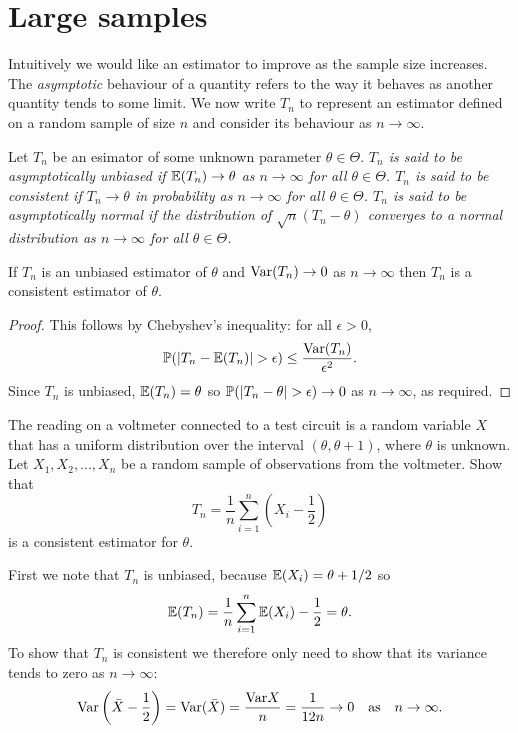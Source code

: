 
\section{Large samples}\label{sec:large_samples}

Intuitively we would like an estimator to improve as the sample size increases. The \emph{asymptotic} behaviour of a quantity refers to the way it behaves as another quantity tends to some limit. We now write $T_n$ to represent an estimator defined on a random sample of size $n$ and consider its behaviour as $n\to\infty$.

\begin{definition}
Let $T_n$ be an esimator of some unknown parameter $\theta\in\Theta$.
\ben
\it $T_n$ is said to be \emph{asymptotically unbiased} if %
$\mathbb{E}(T_n)\to\theta$ as $n\to\infty$ for all $\theta\in\Theta$.
\it $T_n$ is said to be \emph{consistent} if %
$T_n\to\theta$ in probability as $n\to\infty$ for all $\theta\in\Theta$.
\it $T_n$ is said to be \emph{asymptotically normal} if the distribution of $\sqrt{n}(T_n-\theta)$ converges to a normal distribution as $n\to\infty$ for all $\theta\in\Theta$.
\een
\end{definition}

\begin{lemma}
If $T_n$ is an unbiased estimator of $\theta$ and $\text{Var}(T_n)\to 0$ as $n\to\infty$ then $T_n$ is a consistent estimator of $\theta$.
\end{lemma}
\begin{proof}
This follows by Chebyshev's inequality: for all $\epsilon>0$,
\[
\prob(|T_n-\expe(T_n)|> \epsilon) \leq \frac{\var(T_n)}{\epsilon^2}.
\]
Since $T_n$ is unbiased, $\mathbb{E}(T_n)=\theta$ so $\prob(|T_n - \theta|>\epsilon)\to 0$ as $n\to\infty$, as required.
\end{proof}

\begin{example}
The reading on a voltmeter connected to a test circuit is a random variable $X$ that has a uniform distribution over the interval $(\theta,\theta+1)$, where $\theta$ is unknown. Let $X_1, X_2, ...,X_n$ be a random sample of observations from the voltmeter. Show that
\[
T_n = \frac{1}{n}\sum_{i=1}^n\left( X_i - \frac{1}{2}\right)
\]
is a consistent estimator for $\theta$.
\begin{solution}
First we note that $T_n$ is unbiased, because $\mathbb{E}(X_i)=\theta+1/2$ so
\[
\mathbb{E}(T_n) = \frac{1}{n}\sum_{i=1}^n \mathbb{E}(X_i) - \frac{1}{2} = \theta.
\]
To show that $T_n$ is consistent we therefore only need to show that its variance tends to zero as $n\to\infty$:
\[
\text{Var}\left(\bar{X}- \frac{1}{2}\right) 
	= \text{Var}(\bar{X}) 
	= \frac{\text{Var}{X}}{n} 
	= \frac{1}{12n} \to 0 \quad\text{as}\quad n\to\infty.
\]
\end{solution}
\end{example}


